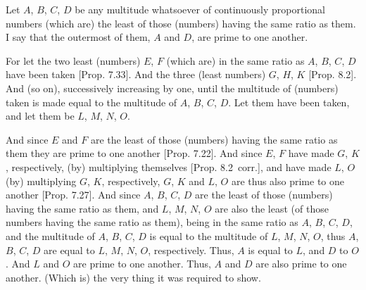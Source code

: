 \begin{Parallel}{}{}
{\epsfysize=2in
\centerline{}

 Let $A$, $B$, $C$, $D$ be  any multitude whatsoever of continuously proportional
numbers (which are)  the least of those (numbers) having the same ratio as them. I say that the outermost of them, $A$ and $D$, are prime to
one another.

For let the two 
least (numbers) $E$, $F$ (which are) in the same ratio as $A$, $B$, $C$,
$D$
have been taken [Prop. 7.33]. And the three
(least numbers) $G$, $H$, $K$ [Prop. 8.2].
And (so on), successively increasing by one, until the multitude of
(numbers) taken is made equal to the multitude of $A$, $B$, $C$,  $D$.
Let them have been taken, and let them be $L$, $M$, $N$,  $O$.

And since $E$ and $F$ are the least of those (numbers) having the
same ratio as them they are prime to one another [Prop. 7.22]. And since  $E$, $F$ have made
 $G$,  $K$, respectively, (by) multiplying themselves [Prop. 8.2~corr.], and  have made $L$,  $O$ 
(by) multiplying  $G$, $K$, respectively,  $G$, $K$ and $L$, $O$ are thus
 also prime to one another [Prop. 7.27]. 
And since $A$, $B$, $C$, $D$ are the least of those (numbers) having
the same ratio as them, and $L$, $M$, $N$,  $O$ are also the
least (of those numbers having the same ratio as them), being in the
same ratio as $A$, $B$, $C$, $D$, and the
multitude of $A$, $B$, $C$,  $D$ is equal to the multitude
of $L$, $M$, $N$,  $O$,  thus $A$, $B$, $C$,  $D$ are
equal to  $L$, $M$, $N$,  $O$, respectively. Thus, $A$ is equal to $L$, and $D$ to $O$. And $L$ and $O$ are prime to one another. Thus,
$A$ and $D$ are also prime to one another. (Which is) the very thing it was required to show.}
\end{Parallel}

